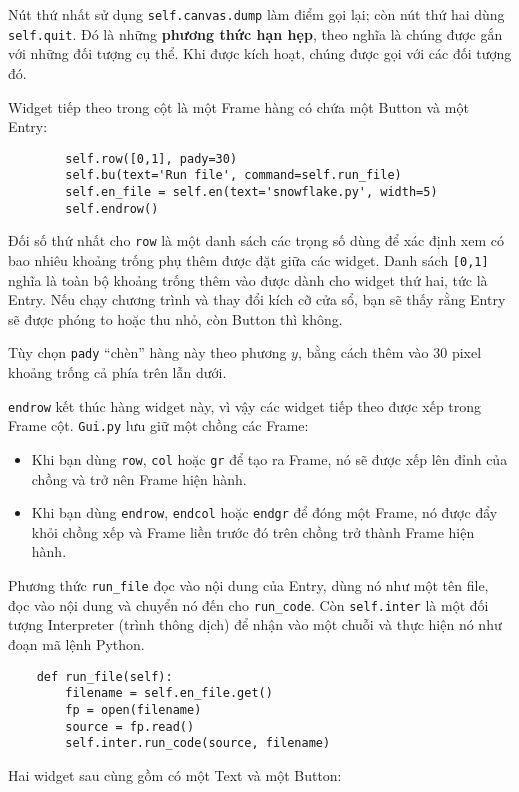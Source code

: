 \documentclass[11pt]{book}
\begin{document}

Nút thứ nhất sử dụng {\tt self.canvas.dump} làm điểm gọi lại; còn nút
thứ hai dùng {\tt self.quit}.  Đó là những {\bf phương thức hạn hẹp}, theo nghĩa
là chúng được gắn với những đối tượng cụ thể. Khi được kích hoạt, chúng
được gọi với các đối tượng đó.

Widget tiếp theo trong cột là một Frame hàng có chứa một
Button và một Entry:

\beforeverb
\begin{verbatim}
        self.row([0,1], pady=30)
        self.bu(text='Run file', command=self.run_file)
        self.en_file = self.en(text='snowflake.py', width=5)
        self.endrow()
\end{verbatim}
\afterverb
%
Đối số thứ nhất cho {\tt row} là một danh sách các trọng số
dùng để xác định xem có bao nhiêu khoảng trống phụ thêm được đặt
giữa các widget.
Danh sách {\tt [0,1]} nghĩa là toàn bộ khoảng trống thêm vào được
dành cho widget thứ hai, tức là Entry.  Nếu chạy chương trình và
thay đổi kích cỡ cửa sổ, bạn sẽ thấy rằng Entry sẽ được phóng to
hoặc thu nhỏ, còn Button thì không.

Tùy chọn {\tt pady} ``chèn'' hàng này theo phương $y$,
bằng cách thêm vào 30 pixel khoảng trống cả phía trên lẫn dưới.

{\tt endrow} kết thúc hàng widget này, vì vậy các widget tiếp theo 
được xếp trong Frame cột. {\tt Gui.py} lưu giữ một chồng các Frame:

\begin{itemize}

\item Khi bạn dùng {\tt row}, {\tt col} hoặc {\tt gr} để tạo ra Frame,
nó sẽ được xếp lên đỉnh của chồng và trở nên Frame hiện hành.

\item Khi bạn dùng {\tt endrow}, {\tt endcol} hoặc {\tt endgr} để đóng
một Frame, nó được đẩy khỏi chồng xếp và Frame liền trước đó trên chồng
trở thành Frame hiện hành.

\end{itemize} 

Phương thức \verb"run_file" đọc vào nội dung của Entry,
dùng nó như một tên file, đọc vào nội dung
và chuyển nó đến cho \verb"run_code".  Còn {\tt self.inter} là một
đối tượng Interpreter (trình thông dịch) để nhận vào một chuỗi và
thực hiện nó như đoạn mã lệnh Python.

\beforeverb
\begin{verbatim}
    def run_file(self):
        filename = self.en_file.get()
        fp = open(filename)
        source = fp.read()
        self.inter.run_code(source, filename)
\end{verbatim}
\afterverb
%
Hai widget sau cùng gồm có một Text và một Button:
\end{document}

